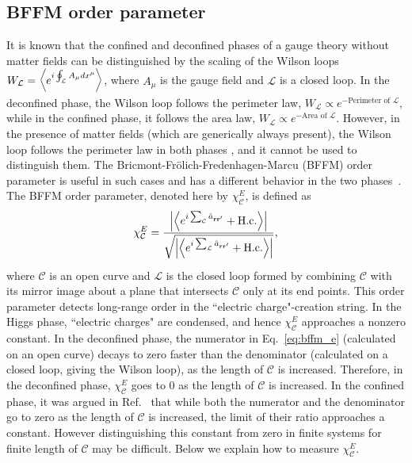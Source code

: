 \documentclass[twocolumn,superscriptaddress,amsmath,amssymb,aps,prx,nofootinbib]{revtex4-2}
\begin{document}
\subsection{BFFM order parameter} \label{sec:fm_order_param}


It is known that the confined and deconfined phases of a gauge theory without matter fields can be distinguished by the scaling of the Wilson loops $W_\mathcal{L} = \expval{ e^{i \oint_\mathcal{L} A_\mu dx^\mu} }$, where $A_\mu$ is the gauge field and $\mathcal{L}$ is a closed loop. In the deconfined phase, the Wilson loop follows the perimeter law, $W_{\mathcal{L}} \propto e^{-\text{Perimeter of }\mathcal{L}}$, while in the confined phase, it follows the area law, $W_{\mathcal{L}} \propto e^{-\text{Area of }\mathcal{L}}$. However, in the presence of matter fields (which are generically always present), the Wilson loop follows the perimeter law in both phases \cite{fradkin2013field,shankar2017quantum}, and it cannot be used to distinguish  them. The Bricmont-Fr{\"o}lich-Fredenhagen-Marcu (BFFM)  order parameter is useful in such cases and has  a different behavior in the two phases~\cite{fredenhagen1983charged,fredenhagen1986,fredenhagen1988dual,marcu1986uses,bricmont1983order,gregor2011diagnosing,verresen2021,semeghini2021}. The BFFM order parameter, denoted here by $\chi^E_{\mathcal{C}}$, is defined as
\begin{equation} \label{eq:bffm_e}
  \chi_{\mathcal{C}}^E = \frac{\abs{ \expval{ e^{i\sum_\mathcal{C} \hat{a}_{\vb{r}\vb{r}'}  } +\text{H.c.} } } }{\sqrt{ \abs{ \expval{ e^{i \sum_{\mathcal{L}} \hat{a}_{\vb{r} \vb{r}'} } + \text{H.c.} }  }}},
\end{equation}
where $\mathcal{C}$ is an open curve and $\mathcal{L}$ is the closed loop formed by combining $\mathcal{C}$ with its mirror image about a plane that intersects $\mathcal{C}$ only at its end points. This order parameter detects long-range order in the ``electric charge"-creation string. In the Higgs phase, ``electric charges" are condensed, and hence $\chi_{\mathcal{C}}^E$ approaches a nonzero constant. In the deconfined phase, the numerator in Eq.~\eqref{eq:bffm_e} (calculated on an open curve) decays to zero faster than the denominator (calculated on a closed loop, giving the Wilson loop), as the length of $\mathcal{C}$ is increased. Therefore, in the deconfined phase, $\chi_{\mathcal{C}}^E$ goes to 0 as the length of $\mathcal{C}$ is increased. In the confined phase, it was argued in Ref.~\cite{fredenhagen1986} that while both the numerator and the denominator go to zero as the length of $\mathcal{C}$ is increased, the limit of their ratio approaches a constant. However distinguishing this constant from zero in finite systems for finite length of $\mathcal{C}$ may be difficult.
Below we explain how to measure $\chi_{\mathcal{C}}^E$. 
\end{document}
